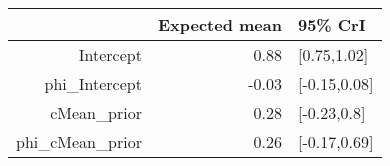 \begin{tabular}{rrl}
  \hline
 & Expected mean & 95\% CrI \\ 
  \hline
Intercept & 0.88 & [0.75,1.02] \\ 
  phi\_Intercept & -0.03 & [-0.15,0.08] \\ 
  cMean\_prior & 0.28 & [-0.23,0.8] \\ 
  phi\_cMean\_prior & 0.26 & [-0.17,0.69] \\ 
   \hline
\end{tabular}

